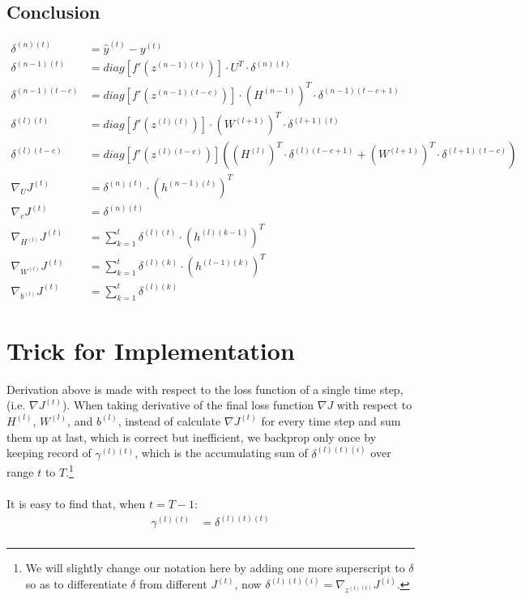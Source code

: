 \documentclass{article}
\begin{document}
	\subsection{Conclusion}
	\begin{align}
		\delta^{(n)(t)} &= \hat{y}^{(t)} - y^{(t)} \\
		\delta^{(n-1)(t)} &= diag[f'(z^{(n-1)(t)})] \cdot U^T \cdot \delta^{(n)(t)} \\
		\delta^{(n-1)(t-c)} &= diag[f'(z^{(n-1)(t-c)})] \cdot (H^{(n-1)})^T \cdot \delta^{(n-1)(t-c+1)} \\
		\delta^{(l)(t)} &= diag[f'(z^{(l)(t)})] \cdot (W^{(l+1)})^T \cdot \delta^{(l+1)(t)} \\
		\delta^{(l)(t-c)} &= diag[f'(z^{(l)(t-c)})] ((H^{(l)})^T \cdot \delta^{(l)(t-c+1)} + (W^{(l+1)})^T \cdot \delta^{(l+1)(t-c)}) \\
		\nabla_{U} J^{(t)} &= \delta^{(n)(t)} \cdot (h^{(n-1)(t)})^T \\
		\nabla_{c} J^{(t)} &= \delta^{(n)(t)} \\
		\nabla_{H^{(l)}} J^{(t)} &= \sum_{k=1}^{t} \delta^{(l)(t)} \cdot (h^{(l)(k-1)})^T \\
		\nabla_{W^{(l)}} J^{(t)} &= \sum_{k=1}^{t} \delta^{(l)(k)} \cdot (h^{(l-1)(k)})^T \\
		\nabla_{b^{(l)}} J^{(t)} &= \sum_{k=1}^{t} \delta^{(l)(k)}
	\end{align}
	
	\newpage
	\section{Trick for Implementation}
	Derivation above is made with respect to the loss function of a single time step, (i.e. $\nabla J^{(t)}$). When taking derivative of the final loss function $\nabla J$ with respect to $H^{(l)}$, $W^{(l)}$, and $b^{(l)}$, instead of calculate $\nabla J^{(t)}$ for every time step and sum them up at last, which is correct but inefficient, we backprop only once by keeping record of $\gamma^{(l)(t)}$, which is the accumulating sum of $\delta^{(l)(t)(i)}$ over range $t$ to $T$.\footnote{We will slightly change our notation here by adding one more superscript to $\delta$ so as to differentiate $\delta$ from different $J^{(t)}$, now $\delta^{(l)(t)(i)} = \nabla_{z^{(l)(t)}}J^{(i)}$.} \\\\
	It is easy to find that, when $t = T-1$:\\
	\begin{equation}
	\begin{aligned}
		\gamma^{(l)(t)} &= \delta^{(l)(t)(t)} \\
	\end{aligned}
	\end{equation}
	
\end{document}

